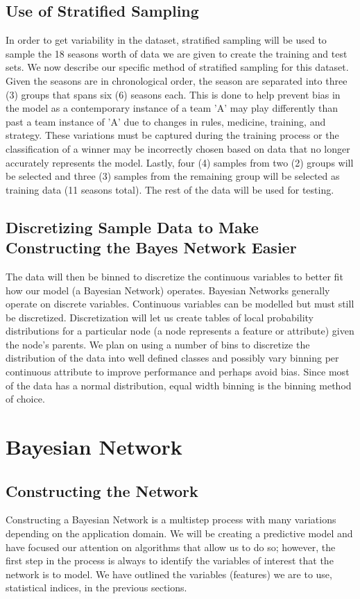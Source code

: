 \documentclass{acm_proc_article-sp}
\begin{document}
\subsection{Use of Stratified Sampling}
In order to get variability in the dataset, stratified sampling will be used to sample the 18 seasons worth of data we are given to create the training and test sets. We now describe our specific method of stratified sampling for this dataset. Given the seasons are in chronological order, the season are separated into three (3) groups that spans six (6) seasons each. This is done to help prevent bias in the model as a contemporary instance of a team 'A' may play differently than past a team instance of 'A' due to changes in rules, medicine, training, and strategy. These variations must be captured during the training process or the classification of a winner may 
be incorrectly chosen based on data that no longer accurately represents the model. Lastly, four (4) 
samples from two (2) groups will be selected and three (3) samples from the remaining group will be 
selected as training data (11 seasons total). The rest of the data will be used for testing.
\subsection{Discretizing Sample Data to Make Constructing the Bayes Network Easier}
The data will then be binned to discretize the continuous variables to better fit how our model 
(a Bayesian Network) operates. Bayesian Networks generally operate on discrete variables. Continuous 
variables can be modelled but must still be discretized.\cite{cobb} Discretization will let us 
create tables of local probability distributions for a particular node (a node represents a feature or attribute) given the node's parents. We plan on using a number of bins to discretize the distribution of the data into well defined classes and possibly vary binning per continuous attribute to improve performance and perhaps avoid bias. Since most of the data has a normal distribution, equal width binning is the binning method of choice.
\newpage
\section{Bayesian Network}
\subsection{Constructing the Network}
Constructing a Bayesian Network is a multistep process with many variations depending on the 
application domain. We will be creating a predictive model and have focused our attention on 
algorithms that allow us to do so; however, the first step in the process is always to identify the 
variables of interest that the network is to model. We have outlined the variables (features) we are 
to use, statistical indices, in the previous sections.
\end{document}
